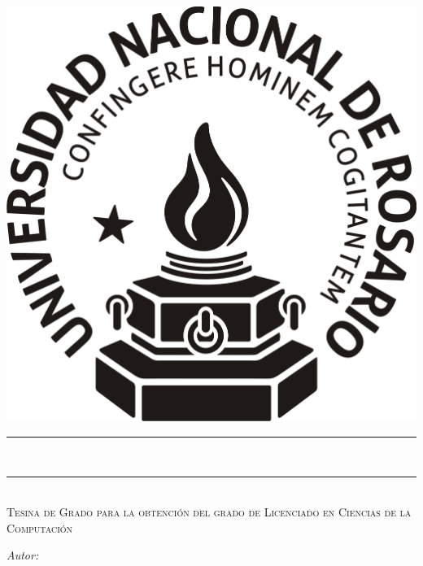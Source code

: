 
\begin{titlepage}
	\centering
    \vspace*{-3.0 cm}
    \includegraphics[scale = 0.4]{UNR.png}\\	%
    \rule{\linewidth}{0.2 mm} \\
    \vspace{-0.25cm}
    \begin{spacing}{0}
        \huge \bfseries \onehalfspacing \thetitle
        \vspace{-\baselineskip}
    \end{spacing}
    \vspace{0.25cm}
    \rule{\linewidth}{0.2 mm}\\
    \textsc{Tesina de Grado para la obtención del grado de Licenciado en Ciencias de la Computación}\\[1.5 cm]		%
	\begin{minipage}{0.4\textwidth}
		\begin{center} \large
			\textit{Autor: \theauthor}\linebreak
			\end{center}

\end{minipage}
\end{titlepage}
